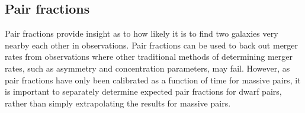 \documentclass[twocolumn]{aastex63}
\newcommand\msun{\rm{M}_{\odot}}
\newcommand\ID{\textit{Illustris-Dark}}
\newcommand\IH{\textit{Illustris-Hydro}}
\newcommand{\kc}[1]{\textcolor{mypink}{\textbf{#1}} }
\newcommand{\gb}[1]{\textcolor{olive}{\textbf{#1}} }
\begin{document}
\subsection{Pair fractions}\label{sec:pairFracs}


Pair fractions provide insight as to how likely it is to find two galaxies very nearby each other in observations. Pair fractions can be used to back out merger rates from observations where other traditional methods of determining merger rates, such as asymmetry and concentration parameters, may fail. However, as pair fractions have only been calibrated as a function of time for massive pairs, it is important to separately determine expected pair fractions for dwarf pairs, rather than simply extrapolating the results for massive pairs.
\end{document}
